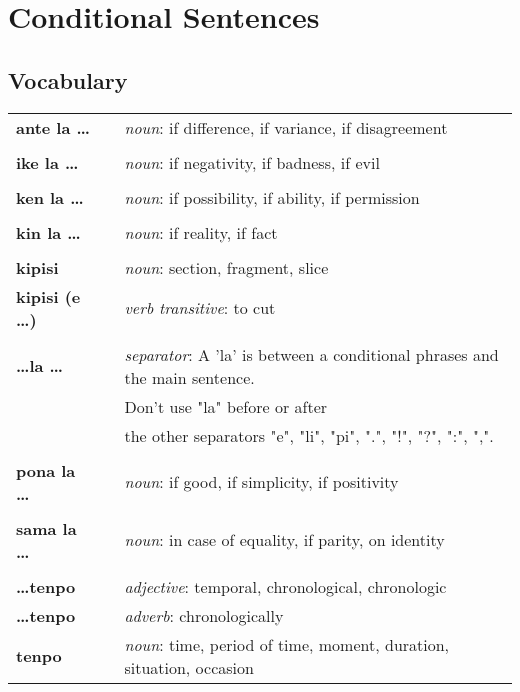 \section{Conditional Sentences}
%
\subsection*{Vocabulary}
%
\begin{supertabular}{p{2,5cm}|ll}
%
\textbf{ante la \dots} && \textit{noun}: if difference, if variance, if disagreement  \\ %
 && \\ %
%
\textbf{ike la \dots} && \textit{noun}: if negativity, if badness, if evil \\ %
 && \\ %
%
\textbf{ken la \dots} && \textit{noun}: if possibility, if ability, if permission \\ %
 && \\ %
%
\textbf{kin la \dots} && \textit{noun}: if reality, if fact \\  %
 && \\ %
%
\textbf{kipisi} && \textit{noun}: section, fragment, slice \\ %
\textbf{kipisi (e \dots)} && \textit{verb transitive}: to cut \\ %
 && \\ %
%
\textbf{\dots la \dots} && \textit{separator}: A 'la' is between a conditional phrases and the main sentence. \\ &&  Don't use "la" before or after \\ && the other separators "e", "li", "pi", ".", "!", "?", ":", ",".  \\ %
 && \\ %
%
\textbf{pona la \dots} && \textit{noun}: if good, if simplicity, if positivity \\ %
 && \\ %
%
\textbf{sama la \dots} && \textit{noun}: in case of equality, if parity, on identity  \\  
 && \\ %
%
\textbf{\dots tenpo} && \textit{adjective}: temporal, chronological, chronologic \\ %
\textbf{\dots tenpo} && \textit{adverb}: chronologically \\ %
\textbf{tenpo} && \textit{noun}: time, period of time, moment, duration, situation, occasion \\ %
%
\end{supertabular} \\
